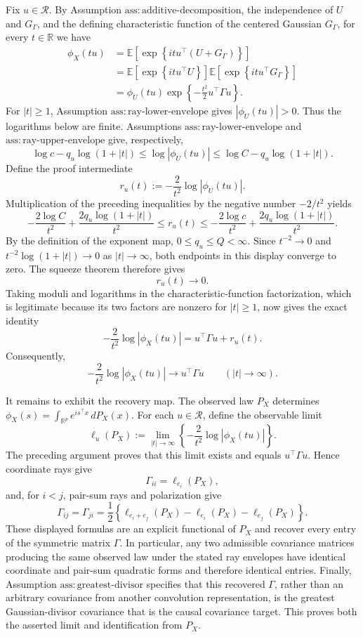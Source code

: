 Fix \(u\in\mathcal R\).  By Assumption \(\mathrm{ass{:}additive\mbox{-}decomposition}\), the independence of \(U\) and \(G_\Gamma\), and the defining characteristic function of the centered Gaussian \(G_\Gamma\), for every \(t\in\mathbb R\) we have
\[
\begin{aligned}
\phi_X(tu)
&=\mathbb E\!\left[\exp\!\left\{it u^\top(U+G_\Gamma)\right\}\right]\\
&=\mathbb E\!\left[\exp\!\left\{it u^\top U\right\}\right]
  \mathbb E\!\left[\exp\!\left\{it u^\top G_\Gamma\right\}\right]\\
&=\phi_U(tu)\exp\!\left\{-\frac{t^2}{2}u^\top\Gamma u\right\}.
\end{aligned}
\]
For \(|t|\geq 1\), Assumption \(\mathrm{ass{:}ray\mbox{-}lower\mbox{-}envelope}\) gives \(|\phi_U(tu)|>0\).  Thus the logarithms below are finite.  Assumptions \(\mathrm{ass{:}ray\mbox{-}lower\mbox{-}envelope}\) and \(\mathrm{ass{:}ray\mbox{-}upper\mbox{-}envelope}\) give, respectively,
\[
\log c-q_u\log(1+|t|)
\leq \log|\phi_U(tu)|
\leq \log C-q_u\log(1+|t|).
\]
Define the proof intermediate
\[
r_u(t):=-\frac{2}{t^2}\log|\phi_U(tu)|.
\]
Multiplication of the preceding inequalities by the negative number \(-2/t^2\) yields
\[
-\frac{2\log C}{t^2}
+\frac{2q_u\log(1+|t|)}{t^2}
\leq r_u(t)
\leq
-\frac{2\log c}{t^2}
+\frac{2q_u\log(1+|t|)}{t^2}.
\]
By the definition of the exponent map, \(0\leq q_u\leq Q<\infty\).  Since \(t^{-2}\to0\) and \(t^{-2}\log(1+|t|)\to0\) as \(|t|\to\infty\), both endpoints in this display converge to zero.  The squeeze theorem therefore gives
\[
r_u(t)\longrightarrow0.
\]
Taking moduli and logarithms in the characteristic-function factorization, which is legitimate because its two factors are nonzero for \(|t|\geq1\), now gives the exact identity
\[
-\frac{2}{t^2}\log|\phi_X(tu)|
=u^\top\Gamma u+r_u(t).
\]
Consequently,
\[
-\frac{2}{t^2}\log|\phi_X(tu)|
\longrightarrow u^\top\Gamma u
\qquad (|t|\to\infty).
\]

It remains to exhibit the recovery map.  The observed law \(P_X\) determines \(\phi_X(s)=\int_{\mathbb R^p}e^{is^\top x}\,dP_X(x)\).  For each \(u\in\mathcal R\), define the observable limit
\[
\ell_u(P_X):=\lim_{|t|\to\infty}
\left\{-\frac{2}{t^2}\log|\phi_X(tu)|\right\}.
\]
The preceding argument proves that this limit exists and equals \(u^\top\Gamma u\).  Hence coordinate rays give
\[
\Gamma_{ii}=\ell_{e_i}(P_X),
\]
and, for \(i<j\), pair-sum rays and polarization give
\[
\Gamma_{ij}=\Gamma_{ji}
=\frac{1}{2}\left\{
\ell_{e_i+e_j}(P_X)-\ell_{e_i}(P_X)-\ell_{e_j}(P_X)
\right\}.
\]
These displayed formulas are an explicit functional of \(P_X\) and recover every entry of the symmetric matrix \(\Gamma\).  In particular, any two admissible covariance matrices producing the same observed law under the stated ray envelopes have identical coordinate and pair-sum quadratic forms and therefore identical entries.  Finally, Assumption \(\mathrm{ass{:}greatest\mbox{-}divisor}\) specifies that this recovered \(\Gamma\), rather than an arbitrary covariance from another convolution representation, is the greatest Gaussian-divisor covariance that is the causal covariance target.  This proves both the asserted limit and identification from \(P_X\).
